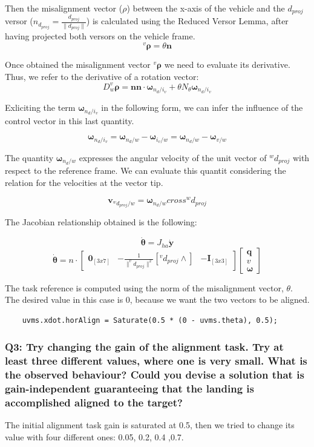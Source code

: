 \documentclass{article}
\begin{document}
Then the misalignment vector (\(\rho\)) between the x-axis of the vehicle and the \(d_{proj}\) versor (\(n_{d_{proj}}=\frac{d_{proj}}{\|d_{proj}\|}\)) is calculated using the Reduced Versor Lemma, after having projected both versors on the vehicle frame.
$$^v\bm{\rho} = \theta \bm{n}$$

Once obtained the misalignment vector $^v\bm{\rho} $ we need to evaluate its derivative. Thus, we refer to the derivative of a rotation vector:
$$
D_w ^v\bm{\rho} = \bm{n}\bm{n} \cdot \bm{\omega}_{n_d/i_v} + \theta N_{\theta}\bm{\omega}_{n_d/i_v}
$$

Exliciting the term $\bm{\omega}_{n_d/i_v}$ in the following form, we can infer the influence of the control vector in this last quantity.

$$
\bm{\omega}_{n_d/i_v}= \bm{\omega}_{n_d/w} - \bm{\omega}_{i_v/w} = \bm{\omega}_{n_d/w} - \bm{\omega}_{v/w}
$$

The quantity $ \bm{\omega}_{n_d/w}$ expresses the angular velocity of the unit vector of $^wd_{proj}$ with respect to the reference frame. We can evaluate this quantit considering the relation for the velocities at the vector tip.

$$
\bm{v}_{^wd_{proj}/w} = \bm{\omega}_{n_d/w} cross ^wd_{proj}
$$
 
 
The Jacobian relationship obtained is the following:

$$ \bm{\dot{\theta}} = J_{ha} \bm{\dot{y}}$$
$$ \bm{\dot{\theta}} = n \cdot \begin{bmatrix} \bm{0}_{[3x7]} & -\frac{1}{\|^vd_{proj}\|^2}[^vd_{proj}\wedge] & -\bm{I}_{[3x3]} \end{bmatrix} \begin{bmatrix} \bm{q}   \\ \bm{\textit{v}} \\ \bm{\omega} \end{bmatrix} $$

The task reference is computed using the norm of the misalignment vector, $\theta$. The desired value in this case is \(0\), because we want the two vectors to be aligned.

\begin{lstlisting}
	uvms.xdot.horAlign = Saturate(0.5 * (0 - uvms.theta), 0.5);
\end{lstlisting}

\subsubsection{Q3: Try changing the gain of the alignment task. Try at least three different values, where one is very small. What is the observed behaviour? Could you devise a solution that is gain-independent guaranteeing that the landing is accomplished aligned to the target?}
The initial alignment task gain is saturated at 0.5, then we tried to change its value with four different ones: 0.05, 0.2, 0.4 ,0.7.
\end{document}
